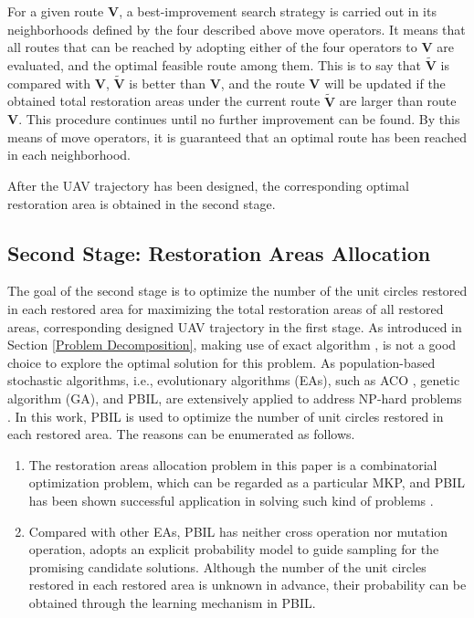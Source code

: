 \documentclass[preprint,5pt]{elsarticle}
\begin{document}
For a given route $\mathbf{V}$, a best-improvement search strategy is carried out in its neighborhoods defined by the four described above move operators. It means that all routes that can be reached by adopting either of the four operators to $\mathbf{V}$ are evaluated, and the optimal feasible route among them. This is to say that $\mathbf{\tilde{V}}$ is compared with $\mathbf{V}$, $\mathbf{\tilde{V}}$ is better than $\mathbf{V}$, and the route $\mathbf{V}$ will be updated if the obtained total restoration areas under the current route $\mathbf{\tilde{V}}$ are larger than route $\mathbf{V}$. This procedure continues until no further improvement can be found. By this means of move operators, it is guaranteed that an optimal route has been reached in each neighborhood.

After the UAV trajectory has been designed, the corresponding optimal restoration area is obtained in the second stage.
\subsection{Second Stage: Restoration Areas Allocation}
The goal of the second stage is to optimize the number of the unit circles restored in each restored area for maximizing the total restoration areas of all restored areas, corresponding designed UAV trajectory in the first stage. As introduced in Section \ref{Problem Decomposition}, making use of exact algorithm \cite{fleszar2021branch}, is not a good choice to explore the optimal solution for this problem. As population-based stochastic algorithms, i.e., evolutionary algorithms (EAs), such as ACO , genetic algorithm (GA), and PBIL, are extensively applied to address NP-hard problems \cite{fidanova2021multiple,rezoug2018guided,jiao2017estimation}. In this work, PBIL is used to optimize the number of unit circles restored in each restored area. The reasons can be enumerated as follows.
\begin{enumerate}
  \item The restoration areas allocation problem in this paper is a combinatorial optimization problem, which can be regarded as a particular MKP, and PBIL has been shown successful application in solving such kind of problems \cite{wang2012effective}.
  \item Compared with other EAs, PBIL has neither cross operation nor mutation operation, adopts an explicit probability model to guide sampling for the promising candidate solutions. Although the number of the unit circles restored in each restored area is unknown in advance, their probability can be obtained through the learning mechanism in PBIL.
\end{enumerate}
\end{document}
